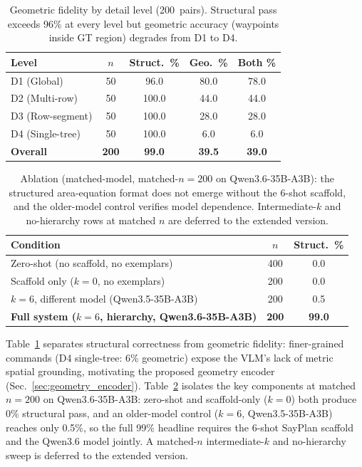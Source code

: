 \documentclass{article}
\begin{document}
\begin{table}[t]
\centering
\caption{Geometric fidelity by detail level (200~pairs). Structural pass exceeds 96\% at every level but geometric accuracy (waypoints inside GT region) degrades from D1 to D4.}
\label{tab:geometric}
\small
\setlength{\tabcolsep}{5pt}
\begin{tabular}{lcccc}
\toprule
Level & $n$ & Struct.\ \% & Geo.\ \% & Both \% \\
\midrule
D1 (Global) & 50 & 96.0 & 80.0 & 78.0 \\
D2 (Multi-row) & 50 & 100.0 & 44.0 & 44.0 \\
D3 (Row-segment) & 50 & 100.0 & 28.0 & 28.0 \\
D4 (Single-tree) & 50 & 100.0 & 6.0 & 6.0 \\
\midrule
\textbf{Overall} & \textbf{200} & \textbf{99.0} & \textbf{39.5} & \textbf{39.0} \\
\bottomrule
\end{tabular}
\end{table}

\begin{table}[t]
\centering
\caption{Ablation (matched-model, matched-$n{=}200$ on Qwen3.6-35B-A3B): the structured area-equation format does not emerge without the 6-shot scaffold, and the older-model control verifies model dependence. Intermediate-$k$ and no-hierarchy rows at matched $n$ are deferred to the extended version.}
\label{tab:ablation}
\small
\setlength{\tabcolsep}{3pt}
\begin{tabular}{lcc}
\toprule
Condition & $n$ & Struct.\ \% \\
\midrule
Zero-shot (no scaffold, no exemplars) & 400 & 0.0 \\
Scaffold only ($k{=}0$, no exemplars) & 200 & 0.0 \\
$k{=}6$, different model (Qwen3.5-35B-A3B) & 200 & 0.5 \\
\midrule
\textbf{Full system ($k{=}6$, hierarchy, Qwen3.6-35B-A3B)} & \textbf{200} & \textbf{99.0} \\
\bottomrule
\end{tabular}
\end{table}

Table~\ref{tab:geometric} separates structural correctness from geometric fidelity: finer-grained commands (D4 single-tree: 6\% geometric) expose the VLM's lack of metric spatial grounding, motivating the proposed geometry encoder (Sec.~\ref{sec:geometry_encoder}). Table~\ref{tab:ablation} isolates the key components at matched $n{=}200$ on Qwen3.6-35B-A3B: zero-shot and scaffold-only ($k{=}0$) both produce 0\% structural pass, and an older-model control ($k{=}6$, Qwen3.5-35B-A3B) reaches only 0.5\%, so the full 99\% headline requires the 6-shot SayPlan scaffold and the Qwen3.6 model jointly. A matched-$n$ intermediate-$k$ and no-hierarchy sweep is deferred to the extended version.
\end{document}
